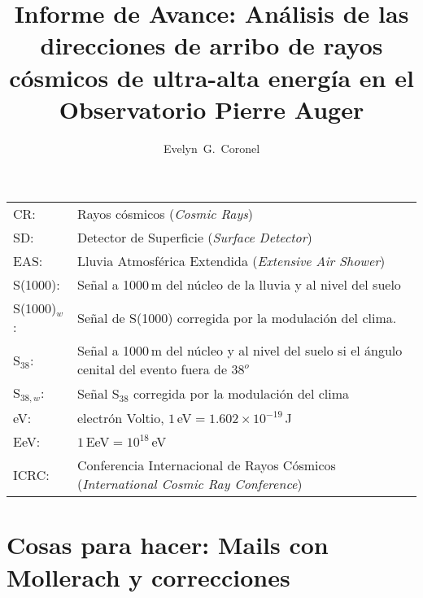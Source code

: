 \documentclass{ibtesis}
\title{Informe de Avance: Análisis de las direcciones de arribo de rayos cósmicos de ultra-alta energía en el Observatorio Pierre Auger}
\author{Evelyn~G.~Coronel}
\begin{document}
\begin{preliminary}


\begin{abreviaturas}

\begin{tabular}{l l}
CR: 		& Rayos cósmicos  (\emph{Cosmic Rays}) \\
SD: 		& Detector de Superficie (\emph{Surface Detector})  \\
EAS: 		& Lluvia Atmosférica Extendida  (\emph{Extensive Air Shower})    \\
S(1000): 	& Señal a 1000\,m del núcleo de la lluvia y al nivel del suelo \\
S(1000)$_w$:& Señal de S(1000) corregida por la modulación del clima. \\
S$_{38}$: 	& Señal a 1000\,m del núcleo y al nivel del suelo si el ángulo cenital del evento fuera de $38^o$\\
S$_{38,w}$: & Señal S$_{38}$ corregida por la modulación del clima \\
eV: 		& electrón Voltio, $1\,$eV$= 1.602\times 10^{-19}\,$J \\
EeV: 		& $1\,$EeV$=10^{18}\,$eV\\
ICRC: 		& Conferencia Internacional de Rayos Cósmicos (\emph{International Cosmic Ray Conference})\\
\end{tabular}
\end{abreviaturas}

	\tableofcontents                %
	\listoffigures                  %


\end{preliminary}


% 


% 


% 



\appendix
\chapter{Cosas para hacer:  Mails con Mollerach y correcciones}



\begin{biblio}
	
\end{biblio}
\end{document}
